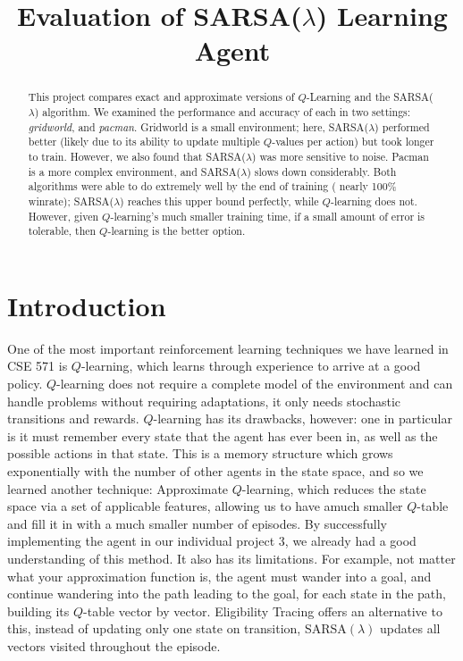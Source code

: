 \documentclass[10pt,conference]{IEEEtran}
\title{
	Evaluation of SARSA(\(\lambda\)) Learning Agent 
	}
\author{
	\IEEEauthorblockN{Padraic Cashin \IEEEauthorrefmark{1}, 
	        Ruihao Zhou \IEEEauthorrefmark{2}
		David Lahtinen \IEEEauthorrefmark{3}, 
		Zubin Kapadia \IEEEauthorrefmark{4},
	}
	\IEEEauthorblockA{
		\IEEEauthorrefmark{1} ASU ID: 1214153888 \\
		\IEEEauthorrefmark{2} ASU ID: 1213439264 \\
		\IEEEauthorrefmark{3} ASU ID: 1207725034 \\
		\IEEEauthorrefmark{4} ASU ID: 1213238024 \\
	}
}
\begin{document}
\maketitle

\begin{abstract}
	This project compares exact and approximate versions of 
	\(Q\)-Learning and the SARSA(\(\lambda\)) algorithm. We examined 
	the performance and accuracy of each in two settings: \textit{gridworld}, and \textit{pacman}. 
	Gridworld is a small environment; here, SARSA(\(\lambda\)) performed better 
	(likely due to its ability to update multiple \(Q\)-values per action) 
	but took longer to train. However, we also found that SARSA(\(\lambda\)) 
	was more sensitive to noise. Pacman is a more complex environment, and SARSA(\(\lambda\)) 
	slows down considerably. Both algorithms were able to do extremely well by the end of training (
	nearly 100\% winrate); SARSA(\(\lambda\)) reaches this upper bound perfectly, 
	while \(Q\)-learning does not. However, given \(Q\)-learning's much smaller training 
	time, if a small amount of error is tolerable, then \(Q\)-learning is the better option.
\end{abstract}

\section{Introduction}

One of the most important reinforcement learning techniques we have learned in CSE 571 is 
\(Q\)-learning, which learns through experience to arrive at a good policy.
\(Q\)-learning does not require a complete model of the environment and 
can handle problems without requiring adaptations, it only needs stochastic 
transitions and rewards. \(Q\)-learning has its drawbacks, however: one in particular is
it must remember every state that the agent has ever been in, as well as the possible actions in that
state. This is a memory structure which grows exponentially with the number of other agents in the state space,
and so we learned another technique: Approximate \(Q\)-learning, 
which reduces the state space via a set of applicable features,
allowing us to have amuch smaller \(Q\)-table and fill it in with a much smaller number of episodes.
By successfully implementing the agent in our individual project 
3, we already had a good understanding of this method. It also has its limitations.
For example, not matter what your approximation function is, the agent must wander into a goal, and continue wandering
into the path leading to the goal, for each state in the path, building its \(Q\)-table vector by vector.
Eligibility Tracing offers an alternative to this, instead of updating only one state on transition,
SARSA\((\lambda)\) updates all vectors visited throughout the episode.
\end{document}
